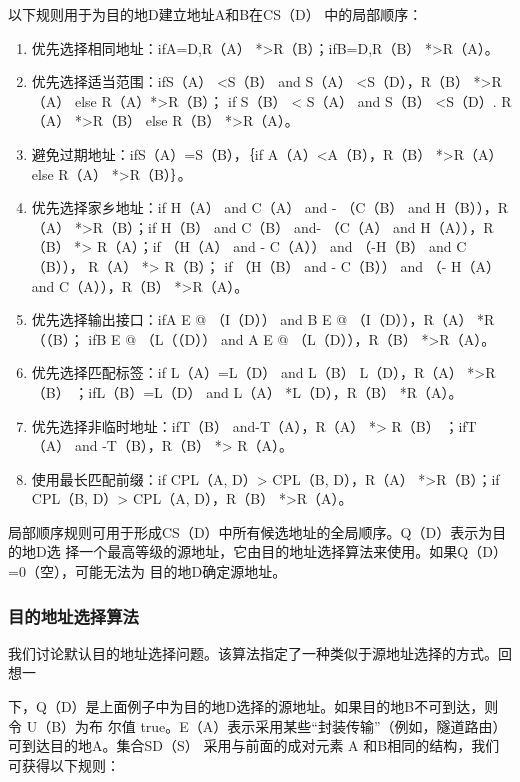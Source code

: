 以下规则用于为目的地D建立地址A和B在CS（D） 中的局部顺序：

\begin{enumerate}
  \item 优先选择相同地址：ifA=D,R（A） *>R（B）；ifB=D,R（B） *>R（A）。

  \item 优先选择适当范围：ifS（A） <S（B） and S（A） <S（D），R（B） *>R（A） else R（A）*>R（B）；
    if S（B） < S（A） and S（B） <S（D）. R（A） *>R（B） else R（B） *>R（A）。

  \item 避免过期地址：ifS（A）=S（B），｛if A（A）<A（B），R（B） *>R（A） else R（A） *>R（B）｝。

  \item 优先选择家乡地址：if H（A） and C（A） and - （C（B） and H（B）），R（A） *>R（B）；if H（B）
    and C（B） and- （C（A） and H（A）），R（B） *> R（A）；if （H（A） and - C（A））
    and （-H（B） and C（B）），
    R（A） *> R（B）； if （H（B） and - C（B）） and （- H（A） and C（A）），R（B） *>R（A）。

  \item 优先选择输出接口：ifA E @ （I（D）） and B E @ （I（D）），R（A） *R（（B）； ifB E @ （L（（D））
    and A E @ （L（D）），R（B） *>R（A）。

  \item  优先选择匹配标签：if L（A）=L（D） and L（B） L（D），R（A） *>R（B） ；ifL（B）=L（D）
    and L（A） *L（D），R（B） *R（A）。

  \item 优先选择非临时地址：ifT（B） and-T（A），R（A） *> R（B） ；ifT（A） and -T（B），R（B） *>
    R（A）。

  \item 使用最长匹配前缀：if CPL（A, D）> CPL（B, D），R（A） *>R（B）；if CPL（B, D）>
    CPL（A, D），R（B） *>R（A）。
\end{enumerate}

局部顺序规则可用于形成CS（D）中所有候选地址的全局顺序。Q（D）表示为目的地D选
择一个最高等级的源地址，它由目的地址选择算法来使用。如果Q（D）=0（空），可能无法为
目的地D确定源地址。

\subsubsection{目的地址选择算法}
我们讨论默认目的地址选择问题。该算法指定了一种类似于源地址选择的方式。回想一

下，Q（D）是上面例子中为目的地D选择的源地址。如果目的地B不可到达，则令 U（B）为布
尔值 true。E（A）表示采用某些“封装传输”（例如，隧道路由）可到达目的地A。集合SD（S）
采用与前面的成对元素 A 和B相同的结构，我们可获得以下规则：

